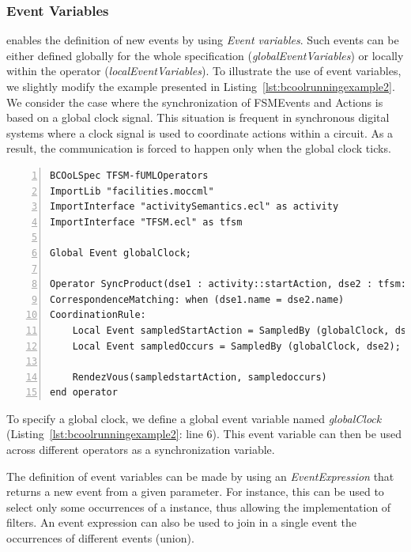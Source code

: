 \subsubsection{Event Variables}
\bcool enables the definition of new events by using \emph{Event variables}. Such events can be either defined globally for the whole specification (\emph{globalEventVariables}) or locally within the operator (\emph{localEventVariables}). To illustrate the use of event variables, we slightly modify the example presented in Listing~\ref{lst:bcoolrunningexample2}. We consider the case where the synchronization of FSMEvents and Actions is based on a global clock signal. This situation is frequent in synchronous digital systems where a clock signal is used to coordinate actions within a circuit. As a result, the communication is forced to happen only when the global clock ticks. 

\begin{lstlisting}[language=bcool,
caption={Synchronized product operator between the TFSM and Activity languages by using Event Variables},
label={lst:bcoolrunningexample2}, 
basicstyle=\scriptsize\ttfamily, backgroundcolor=\color{LGrey}, numbers=left, xleftmargin=2pt]
BCOoLSpec TFSM-fUMLOperators
ImportLib "facilities.moccml"
ImportInterface "activitySemantics.ecl" as activity
ImportInterface "TFSM.ecl" as tfsm

Global Event globalClock;

Operator SyncProduct(dse1 : activity::startAction, dse2 : tfsm::occurs)
CorrespondenceMatching: when (dse1.name = dse2.name)
CoordinationRule: 
	Local Event sampledStartAction = SampledBy (globalClock, dse1);
	Local Event sampledOccurs = SampledBy (globalClock, dse2);
	
	RendezVous(sampledstartAction, sampledoccurs)
end operator
\end{lstlisting}

To specify a global clock, we define a global event variable named \emph{globalClock} (Listing~\ref{lst:bcoolrunningexample2}: line 6). This event variable can then be used across different operators as a synchronization variable. %

The definition of event variables can be made by using an \emph{EventExpression} that returns a new event from a given parameter. For instance, this can be used to select only some occurrences of a \dse instance, thus allowing the implementation of filters. An event expression can also be used to join in a single event the occurrences of different events (union). 

